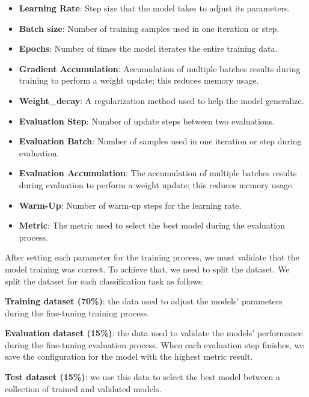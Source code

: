 \begin{itemize}
\item{\textbf{Learning Rate}}: Step size that the model takes to adjust its parameters.
\item{\textbf{Batch size}}: Number of training samples used in one iteration or step.
\item{\textbf{Epochs}}: Number of times the model iterates the entire training data.
\item{\textbf{Gradient Accumulation}}: Accumulation of multiple batches results during training to perform a weight update; this reduces memory usage.
\item{\textbf{Weight\_decay}}: A regularization method used to help the model generalize.
\item{\textbf{Evaluation Step}}: Number of update steps between two evaluations.
\item{\textbf{Evaluation Batch}}: Number of samples used in one iteration or step during evaluation.
\item{\textbf{Evaluation Accumulation}}: The accumulation of multiple batches results during evaluation to perform a weight update; this reduces memory usage.
\item{\textbf{Warm-Up}}: Number of warm-up steps for the learning rate.
\item{\textbf{Metric}}: The metric used to select the best model during the evaluation process.

\end{itemize}

\noindent After setting each parameter for the training process, we must validate that the model training was correct. To achieve that, we need to split the dataset. We split the dataset for each classification task as follows: 

\begin{description}
\item{\textbf{Training dataset (70\%)}}: the data used to adjust the models' parameters during the fine-tuning training process.
\item{\textbf{Evaluation dataset (15\%)}}: the data used to validate the models' performance during the fine-tuning evaluation process. When each evaluation step finishes, we save the configuration for the model with the highest metric result. 
\item{\textbf{Test dataset (15\%)}}: we use this data to select the best model between a collection of trained and validated models.

\end{description}

